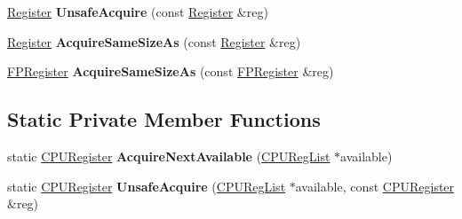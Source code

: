 \begin{DoxyCompactItemize}
\item 
\hyperlink{structv8_1_1internal_1_1_register}{Register} {\bfseries Unsafe\+Acquire} (const \hyperlink{structv8_1_1internal_1_1_register}{Register} \&reg)\hypertarget{classv8_1_1internal_1_1_use_scratch_register_scope_a86ca3b877dec5cc31e7e5af668a00d38}{}\label{classv8_1_1internal_1_1_use_scratch_register_scope_a86ca3b877dec5cc31e7e5af668a00d38}

\item 
\hyperlink{structv8_1_1internal_1_1_register}{Register} {\bfseries Acquire\+Same\+Size\+As} (const \hyperlink{structv8_1_1internal_1_1_register}{Register} \&reg)\hypertarget{classv8_1_1internal_1_1_use_scratch_register_scope_a0b0d1c10e65131fcba00e4e3366808d9}{}\label{classv8_1_1internal_1_1_use_scratch_register_scope_a0b0d1c10e65131fcba00e4e3366808d9}

\item 
\hyperlink{structv8_1_1internal_1_1_f_p_register}{F\+P\+Register} {\bfseries Acquire\+Same\+Size\+As} (const \hyperlink{structv8_1_1internal_1_1_f_p_register}{F\+P\+Register} \&reg)\hypertarget{classv8_1_1internal_1_1_use_scratch_register_scope_a03dbfcc63a102e596144c4dcf2ab9629}{}\label{classv8_1_1internal_1_1_use_scratch_register_scope_a03dbfcc63a102e596144c4dcf2ab9629}

\end{DoxyCompactItemize}
\subsection*{Static Private Member Functions}
\begin{DoxyCompactItemize}
\item 
static \hyperlink{structv8_1_1internal_1_1_c_p_u_register}{C\+P\+U\+Register} {\bfseries Acquire\+Next\+Available} (\hyperlink{classv8_1_1internal_1_1_c_p_u_reg_list}{C\+P\+U\+Reg\+List} $\ast$available)\hypertarget{classv8_1_1internal_1_1_use_scratch_register_scope_abe78d60a255418a5520e831a8c3e2d69}{}\label{classv8_1_1internal_1_1_use_scratch_register_scope_abe78d60a255418a5520e831a8c3e2d69}

\item 
static \hyperlink{structv8_1_1internal_1_1_c_p_u_register}{C\+P\+U\+Register} {\bfseries Unsafe\+Acquire} (\hyperlink{classv8_1_1internal_1_1_c_p_u_reg_list}{C\+P\+U\+Reg\+List} $\ast$available, const \hyperlink{structv8_1_1internal_1_1_c_p_u_register}{C\+P\+U\+Register} \&reg)\hypertarget{classv8_1_1internal_1_1_use_scratch_register_scope_a1c8960c1fa64ae9641cded746a4368df}{}\label{classv8_1_1internal_1_1_use_scratch_register_scope_a1c8960c1fa64ae9641cded746a4368df}

\end{DoxyCompactItemize}
